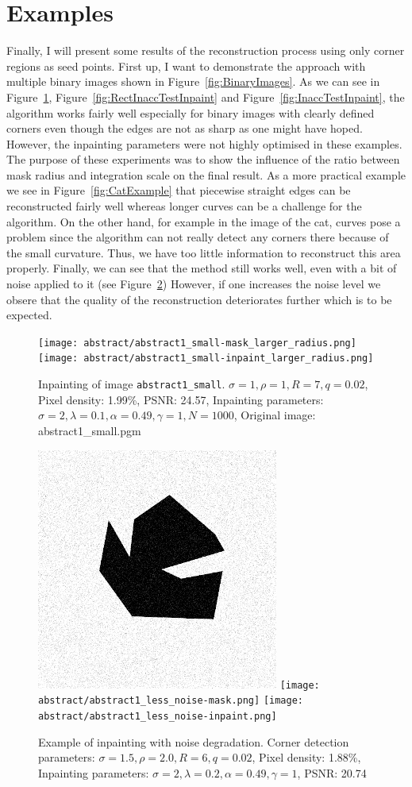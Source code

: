 \section{Examples}\label{sec:Results}
Finally, I will present some results of the reconstruction process using only corner regions as
seed points.
First up, I want to demonstrate the approach with multiple binary images shown in
Figure~\ref{fig:BinaryImages}. As we can see in Figure~\ref{fig:AbstractInpainting}, Figure~\ref{fig:RectInaccTestInpaint} and Figure~\ref{fig:InaccTestInpaint}, the algorithm works fairly well especially for binary
images with clearly defined corners even though the edges are not as sharp as one might have
hoped. However, the inpainting parameters were not highly optimised in these examples. The purpose
of these experiments was to show the influence of the ratio between mask radius and integration
scale on the final result. As a more practical example we see in Figure~\ref{fig:CatExample} that
piecewise straight edges can be reconstructed fairly well whereas longer curves can be a challenge
for the algorithm.  On the other hand, for example in the image of the cat, curves pose a problem since the algorithm can
not really detect any corners there because of the small curvature. Thus, we have too little
information to reconstruct this area properly. 
Finally, we can see that the method still works well, even with a bit of 
noise applied to it (see Figure~\ref{fig:AbstractNoise1})
However, if one increases the noise level we obsere that the quality of the reconstruction
deteriorates further which is to be expected.
\begin{figure}[ht]
    \centering
    \vspace*{0.2cm}
    \texttt{[image: abstract/abstract1\_small-mask\_larger\_radius.png]}\hspace{0.2cm}
    \texttt{[image: abstract/abstract1\_small-inpaint\_larger\_radius.png]}
    \caption{Inpainting of image \texttt{abstract1\_small}. $\sigma=1,\rho=1,R=7,q=0.02$, Pixel
        density: 1.99\%, PSNR\@: 24.57, Inpainting parameters:
        $\sigma=2,\lambda=0.1,\alpha=0.49,\gamma=1,N=1000$, Original image: abstract1\_small.pgm
}\label{fig:AbstractInpainting}
\end{figure}
\begin{figure}[ht]
    \centering
    \includegraphics[width=0.29\linewidth]{../../images/binary/abstract1_less_noise.png}
    \texttt{[image: abstract/abstract1\_less\_noise-mask.png]}
    \texttt{[image: abstract/abstract1\_less\_noise-inpaint.png]}
    \caption{Example of inpainting with noise degradation. Corner detection parameters:
    $\sigma=1.5,\rho=2.0,R=6,q=0.02$, Pixel density: 1.88\%, Inpainting parameters:
$\sigma=2,\lambda=0.2,\alpha=0.49,\gamma=1$, PSNR\@: 20.74}\label{fig:AbstractNoise1}
\end{figure}
